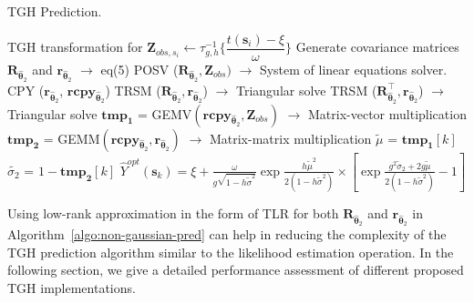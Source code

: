 \documentclass[conference]{IEEEtran}
\begin{document}
\begin{algorithm}[H]
\footnotesize
\caption{TGH Prediction.}
\label{algo:non-gaussian-pred}
\begin{algorithmic}[1]
\STATE TGH transformation for $\bm{Z}_{obs,s_i} \leftarrow \tau_{g,h}^{-1} \bigg \{ \dfrac{t(\bm{s}_i) - \xi}{\omega} \bigg \}$
\STATE  Generate covariance matrices $\bm{R}_{\widehat{\bm{\theta}}_2}$ and $\bm{r}_{\widehat{\bm{\theta}}_2}$  $\rightarrow$ eq(5)
\STATE  POSV ($\bm{R}_{\widehat{\bm{\theta}}_2}, \bm{Z}_{obs})$ $\rightarrow$ System of linear equations solver.
        \STATE CPY ($\bm{r}_{\widehat{\bm{\theta}}_2}$, $\bm{rcpy}_{\widehat{\bm{\theta}}_2}$) 
    \STATE TRSM ($\bm{R}_{\widehat{\bm{\theta}}_2}, \bm{r}_{\widehat{\bm{\theta}}_2}$) $\rightarrow$ Triangular solve
        \STATE TRSM ($\bm{R}_{\widehat{\bm{\theta}}_2}^\top, \bm{r}_{\widehat{\bm{\theta}}_2}$) $\rightarrow$ Triangular solve
                \STATE $\bm{tmp_1}$ = GEMV$(\bm{rcpy}_{\widehat{\bm{\theta}}_2}, \bm{Z}_{obs})$ $\rightarrow$ Matrix-vector multiplication 
                \STATE $\bm{tmp_2}$ = GEMM$ (\bm{rcpy}_{\widehat{\bm{\theta}}_2}, \bm{r}_{\widehat{\bm{\theta}}_2})$ $\rightarrow$ Matrix-matrix multiplication 
                \STATE $\tilde{\mu}$ =  $\bm{tmp_1}[k]$
        \STATE $\tilde{\sigma_2}$ = $1-\bm{tmp_2}[k]$
        \STATE $\widehat{Y}^{opt}(\bm{s}_k)=\xi +  \frac{\omega}{g\sqrt{1-h\tilde{\sigma}^2}} \exp{\frac{h\tilde{\mu}^2}{2(1-h\tilde{\sigma}^2)}}      \times [\exp{\frac{g^2\tilde{\sigma}_2+2g\tilde{\mu}}{2(1-h\tilde{\sigma}^2)}-1}] $
  \ENDFOR
\end{algorithmic}
\end{algorithm}


Using low-rank approximation in the form of TLR for both $\bm{R}_{\widehat{\bm{\theta}}_2}$ and $\bm{r}_{\widehat{\bm{\theta}}_2}$  in
 Algorithm~\ref{algo:non-gaussian-pred} can help
in reducing the complexity of the TGH prediction algorithm
similar to the likelihood estimation operation. In the following
section, we give a detailed performance assessment of different
proposed TGH implementations.
\end{document}
